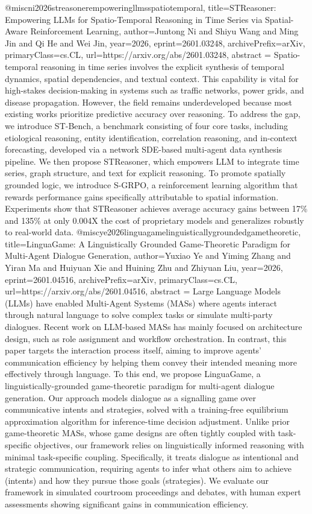 {}@misc{ni2026streasonerempoweringllmsspatiotemporal,
      title={STReasoner: Empowering LLMs for Spatio-Temporal Reasoning in Time Series via Spatial-Aware Reinforcement Learning}, 
      author={Juntong Ni and Shiyu Wang and Ming Jin and Qi He and Wei Jin},
      year={2026},
      eprint={2601.03248},
      archivePrefix={arXiv},
      primaryClass={cs.CL},
      url={https://arxiv.org/abs/2601.03248},
      abstract = {Spatio-temporal reasoning in time series involves the explicit synthesis of temporal dynamics, spatial dependencies, and textual context. This capability is vital for high-stakes decision-making in systems such as traffic networks, power grids, and disease propagation. However, the field remains underdeveloped because most existing works prioritize predictive accuracy over reasoning. To address the gap, we introduce ST-Bench, a benchmark consisting of four core tasks, including etiological reasoning, entity identification, correlation reasoning, and in-context forecasting, developed via a network SDE-based multi-agent data synthesis pipeline. We then propose STReasoner, which empowers LLM to integrate time series, graph structure, and text for explicit reasoning. To promote spatially grounded logic, we introduce S-GRPO, a reinforcement learning algorithm that rewards performance gains specifically attributable to spatial information. Experiments show that STReasoner achieves average accuracy gains between 17\% and 135\% at only 0.004X the cost of proprietary models and generalizes robustly to real-world data.}
}@misc{ye2026linguagamelinguisticallygroundedgametheoretic,
      title={LinguaGame: A Linguistically Grounded Game-Theoretic Paradigm for Multi-Agent Dialogue Generation}, 
      author={Yuxiao Ye and Yiming Zhang and Yiran Ma and Huiyuan Xie and Huining Zhu and Zhiyuan Liu},
      year={2026},
      eprint={2601.04516},
      archivePrefix={arXiv},
      primaryClass={cs.CL},
      url={https://arxiv.org/abs/2601.04516},
      abstract = {Large Language Models (LLMs) have enabled Multi-Agent Systems (MASs) where agents interact through natural language to solve complex tasks or simulate multi-party dialogues. Recent work on LLM-based MASs has mainly focused on architecture design, such as role assignment and workflow orchestration. In contrast, this paper targets the interaction process itself, aiming to improve agents' communication efficiency by helping them convey their intended meaning more effectively through language. To this end, we propose LinguaGame, a linguistically-grounded game-theoretic paradigm for multi-agent dialogue generation. Our approach models dialogue as a signalling game over communicative intents and strategies, solved with a training-free equilibrium approximation algorithm for inference-time decision adjustment. Unlike prior game-theoretic MASs, whose game designs are often tightly coupled with task-specific objectives, our framework relies on linguistically informed reasoning with minimal task-specific coupling. Specifically, it treats dialogue as intentional and strategic communication, requiring agents to infer what others aim to achieve (intents) and how they pursue those goals (strategies). We evaluate our framework in simulated courtroom proceedings and debates, with human expert assessments showing significant gains in communication efficiency.}
}

